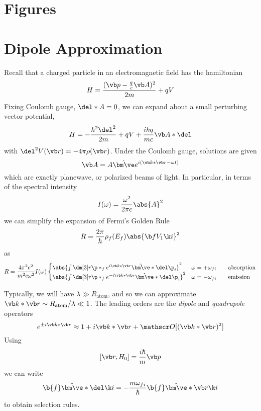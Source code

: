 \documentclass[12pt]{article}
\begin{document}
\section{Figures}

\newpage{}

%

\newpage{}
\appendix{}
\section{Dipole Approximation}
Recall that a charged particle in an electromagnetic field has the hamiltonian
\begin{equation}
    H = \frac{(\vb p- \frac{q}{c}\vb A)^2}{2m}+qV
\end{equation}
Fixing Coulomb gauge, \( \del*A=0 \), we can expand about a small perturbing vector potential,
\begin{equation}
    H=-\frac{\hbar^2\del^2}{2m}+qV + \frac{i\hbar q}{mc}\vb A*\del 
\end{equation}
with \( \del^2 V(\vb r) =-4\pi \rho(\vb r) \). Under the Coulomb gauge, solutions are given
\begin{equation}
    \vb A = A\hat{\bm \ve} e^{i(\vb k*\vb r-\omega t)}
\end{equation}
which are exactly planewave, or polarized beams of light. In particular, in terms of the spectral intensity
\begin{equation}
    I(\omega) = \frac{\omega^2}{2\pi c}\abs{A}^2
\end{equation}
we can simplify the expansion of Fermi's Golden Rule
\begin{equation}
    R = \frac{2\pi}{\hbar}\rho_f(E_f)\abs{\b f V_1 \k i}^2
\end{equation}
as
\begin{equation}
    R = \frac{4\pi^2 e^2}{m^2c\omega^2}I(\omega)\begin{cases}
        \abs{\int\dm[3]r \p\ast_f e^{i\vb k*\vb r}\hat{\bm \ve}*\del \p_i}^2 & \omega=+\omega_{fi} \qquad\text{absorption}\\
        \abs{\int\dm[3]r \p\ast_f e^{-i\vb k*\vb r}\hat{\bm \ve}*\del \p_i}^2 & \omega=-\omega_{fi} \qquad\text{emission}\\
    \end{cases}
\end{equation}

Typically, we will have \( \lambda\gg R_\text{atom} \), and so we can approximate \( \vb k*\vb r\sim R_\text{atom}/\lambda\ll 1 \). The leading orders are the \emph{dipole} and \emph{quadrupole} operators
\[ e^{\pm i\vb k*\vb r}\approx 1+i\vb k*\vb r+\mathscr O[(\vb k*\vb r)^2] \]
Using
\[ [\vb r, H_0]=\frac{i\hbar}{m}\vb p \]
we can write
\begin{equation}
    \b{f}\hat{\bm\ve}*\del \k i = -\frac{m\omega_{fi}}{\hbar}\b{f}\hat{\bm \ve}*\vb r\k i
\end{equation}
to obtain selection rules.
\end{document}
